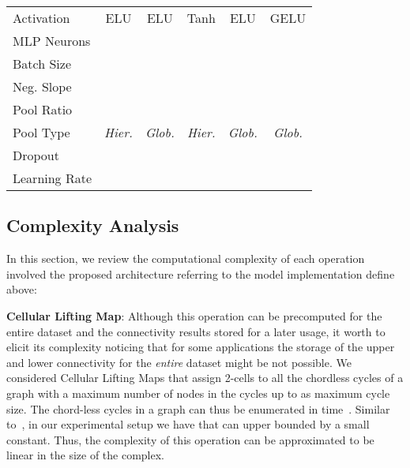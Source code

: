 \documentclass{article}
\begin{document}
\begin{table}[t]
\begin{tabular}{lccccc}
Activation                & \multicolumn{1}{c}{ELU} & \multicolumn{1}{c}{ELU} & \multicolumn{1}{c}{Tanh} & \multicolumn{1}{c}{ELU} & \multicolumn{1}{c}{GELU} \\
MLP Neurons                & \multicolumn{1}{c}{} & \multicolumn{1}{c}{} & \multicolumn{1}{c}{} & \multicolumn{1}{c}{} & \multicolumn{1}{c}{} \\
Batch Size                 & \multicolumn{1}{c}{} & \multicolumn{1}{c}{} & \multicolumn{1}{c}{} & \multicolumn{1}{c}{} & \multicolumn{1}{c}{}\\
Neg. Slope                & \multicolumn{1}{c}{} & \multicolumn{1}{c}{} & \multicolumn{1}{c}{} & \multicolumn{1}{c}{} & \multicolumn{1}{c}{}\\
Pool Ratio         & 
\multicolumn{1}{c}{} & \multicolumn{1}{c}{} & \multicolumn{1}{c}{} & \multicolumn{1}{c}{} & \multicolumn{1}{c}{} \\
Pool Type               & \multicolumn{1}{c}{\textit{Hier.}} & \multicolumn{1}{c}{\textit{Glob.}} & \multicolumn{1}{c}{\textit{Hier.}} & \multicolumn{1}{c}{\textit{Glob.}} & \multicolumn{1}{c}{\textit{Glob.}} \\
Dropout                    & \multicolumn{1}{c}{} & \multicolumn{1}{c}{} & \multicolumn{1}{c}{} & \multicolumn{1}{c}{} & \multicolumn{1}{c}{}\\
Learning Rate               & \multicolumn{1}{c}{} & \multicolumn{1}{c}{} & \multicolumn{1}{c}{} & \multicolumn{1}{c}{} & \multicolumn{1}{c}{}    \\
\bottomrule
\end{tabular}
\end{table}

\subsection{Complexity Analysis}
In this section, we review the computational complexity of each operation involved the proposed architecture referring to the model implementation define above:


\textbf{Cellular Lifting Map}: Although this operation can be precomputed for the entire dataset and the connectivity results stored for a later usage, it worth to elicit its complexity noticing that for some applications the storage of the upper and lower connectivity for the \emph{entire} dataset might be not possible. We considered Cellular Lifting Maps that assign 2-cells to all the chordless cycles of a graph with a maximum number of nodes in the cycles up to  as maximum cycle size. The chord-less cycles in a graph can thus be enumerated in  time~\cite{ferreira14}. Similar to~\cite{bodnarcwnet}, in our experimental setup we have that  can upper bounded by a small constant. Thus, the complexity of this operation can be approximated to be linear in the size of the complex.
\end{document}

